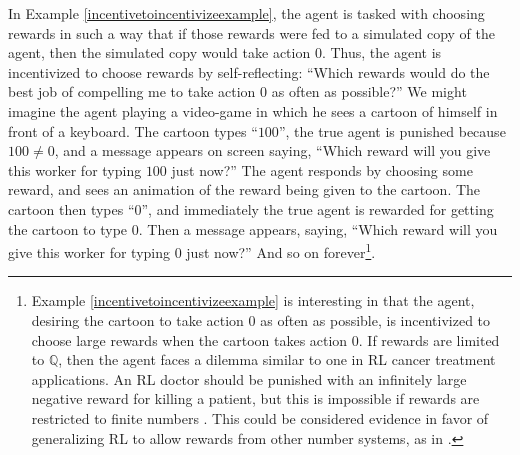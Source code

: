 \documentclass[runningheads]{llncs}
\begin{document}
In Example \ref{incentivetoincentivizeexample}, the agent is tasked with choosing
rewards in such a way that if those rewards were fed to a simulated copy of the agent,
then the simulated copy would take action $0$.
Thus, the agent is incentivized to choose rewards by self-reflecting:
``Which rewards would do the best job of compelling me to take action $0$ as often
as possible?'' We might imagine the agent playing a video-game in which he sees
a cartoon of himself
in front of a keyboard. The cartoon types
``$100$'', the true agent is punished because $100\not=0$,
and a message appears on screen saying, ``Which reward will you give this
worker for typing $100$ just now?'' The
agent responds by choosing some reward, and sees an animation
of the reward being given to the cartoon. The cartoon
then types ``$0$'', and immediately the true agent is rewarded for getting the cartoon
to type $0$. Then a message appears, saying, ``Which reward will you give this
worker for typing $0$ just now?'' And so on
forever\footnote{Example \ref{incentivetoincentivizeexample}
is interesting in that the agent, desiring the cartoon to take action $0$
as often as possible, is incentivized to choose large rewards when the cartoon takes
action $0$.
If rewards are limited to $\mathbb Q$, then the agent faces a dilemma
similar to one in RL cancer treatment applications.
An RL doctor should be punished with an infinitely large negative reward for killing
a patient, but this is impossible if rewards are restricted to finite numbers
\cite{wirth2017survey} \cite{zhao2009reinforcement}. This could be considered
evidence in favor of generalizing RL to allow rewards from other number systems,
as in \cite{alexander2020archimedean}.}.
\end{document}
